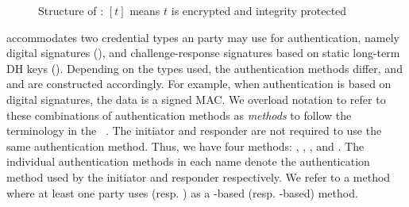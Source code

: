 %
%
\begin{figure}
\centering
{}
\caption{Structure of \mEdhoc{}: $[t]$ means $t$ is encrypted and integrity protected}
\label{fig:edhocFramework}
\end{figure}

\mEdhoc{} accommodates two credential types
an party may use for authentication, 
%
namely digital signatures (\mSig), and challenge-response signatures based on
static long-term DH keys (\mStat).
%
%
Depending on the types used, the authentication methods differ,
and \mAuthi{} and \mAuthr{} are constructed accordingly.
%
For example, when authentication is based on digital signatures, the data is a
signed MAC.
%
%
We overload notation to refer to these combinations of authentication methods as
\emph{methods} to follow the terminology in the \mEdhoc{}
\mSpec{}~\cite{our-analysis-selander-lake-edhoc-01}.
%
The initiator and responder are not required to use the same authentication
method.
%
Thus, we have four methods: \mSigSig, \mSigStat, \mStatStat, and \mStatSig.
%
The individual authentication methods in each name denote the authentication
method used by the initiator and responder respectively.
%
We refer to a method where at least one party uses \mSig{} (resp. \mStat) as a \mSig-based (resp. \mStat-based)
method.
%

